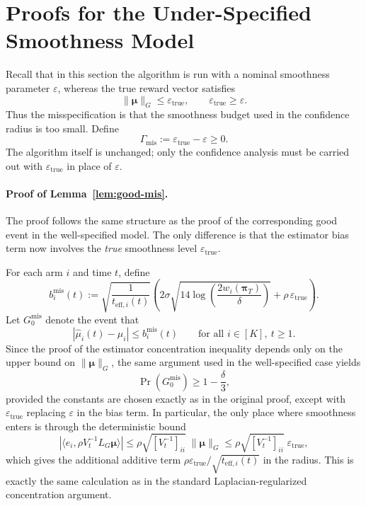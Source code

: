 \documentclass{article}
\begin{document}
\section{Proofs for the Under-Specified Smoothness Model}
\label{app:proofs-misspecified}

Recall that in this section the algorithm is run with a nominal smoothness
parameter $\varepsilon$, whereas the true reward vector satisfies
\[
\|\bm\mu\|_G \le \varepsilon_{\mathrm{true}},
\qquad
\varepsilon_{\mathrm{true}} \ge \varepsilon.
\]
Thus the misspecification is that the smoothness budget used in the confidence
radius is too small. Define
\[
\Gamma_{\mathrm{mis}} := \varepsilon_{\mathrm{true}}-\varepsilon \ge 0.
\]
The algorithm itself is unchanged; only the confidence analysis must be carried
out with $\varepsilon_{\mathrm{true}}$ in place of $\varepsilon$.

\paragraph{Proof of Lemma~\ref{lem:good-mis}.}
The proof follows the same structure as the proof of the corresponding good
event in the well-specified model. The only difference is that the estimator
bias term now involves the \emph{true} smoothness level
$\varepsilon_{\mathrm{true}}$.

For each arm $i$ and time $t$, define
\[
b_i^{\mathrm{mis}}(t)
:=
\sqrt{\frac{1}{t_{\mathrm{eff},i}(t)}}
\left(
2\sigma\sqrt{14\log\!\left(\frac{2w_i(\boldsymbol\pi_T)}{\delta}\right)}
+
\rho\,\varepsilon_{\mathrm{true}}
\right).
\]
Let $G_0^{\mathrm{mis}}$ denote the event that
\[
|\widehat\mu_i(t)-\mu_i|
\le
b_i^{\mathrm{mis}}(t)
\qquad
\text{for all } i \in [K],\ t\ge 1.
\]
Since the proof of the estimator concentration inequality depends only on the
upper bound on $\|\bm\mu\|_G$, the same argument used in the well-specified
case yields
\[
\Pr(G_0^{\mathrm{mis}}) \ge 1-\frac{\delta}{3},
\]
provided the constants are chosen exactly as in the original proof, except with
$\varepsilon_{\mathrm{true}}$ replacing $\varepsilon$ in the bias term. In
particular, the only place where smoothness enters is through the deterministic
bound
\[
|\langle e_i,\rho V_t^{-1}L_G\bm\mu\rangle|
\le
\rho \sqrt{[V_t^{-1}]_{ii}}\;\|\bm\mu\|_G
\le
\rho \sqrt{[V_t^{-1}]_{ii}}\;\varepsilon_{\mathrm{true}},
\]
which gives the additional additive term
$\rho\varepsilon_{\mathrm{true}}/\sqrt{t_{\mathrm{eff},i}(t)}$ in the radius.
This is exactly the same calculation as in the standard Laplacian-regularized
concentration argument. 
\end{document}
